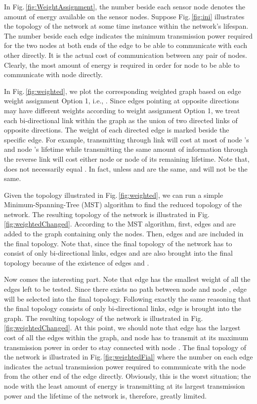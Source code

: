 \documentclass[journal,12pt,onecolumn]{IEEEtran}
\begin{document}
In Fig.\,\ref{fig:WeightAssignment}, the number beside each sensor
node denotes the amount of energy available on the sensor nodes.
Suppose Fig.\,\ref{fig:ini} illustrates the topology of the network
at some time instance within the network's lifespan. The number beside each edge indicates the
minimum transmission power required for the two nodes at both ends
of the edge to be able to communicate with each other directly. It is the actual cost of communication
between any pair of nodes. Clearly, the most amount of energy is required in order for node 
to be able to communicate with node  directly.







In Fig.\,\ref{fig:weighted}, we plot the corresponding weighted
graph based on edge weight assignment Option 1, i.e., . Since edges pointing at
opposite directions may have different weights according to weight
assignment Option 1, we treat each bi-directional link
within the graph as the union of two directed links of opposite
directions. The weight of each directed edge is marked beside the
specific edge. For example, transmitting through link 
will cost at most  of node 's and node 's lifetime while
transmitting the same amount of information through the reverse link
 will cost either node  or node   of its
remaining lifetime. Note that,  does not necessarily equal
. In fact, unless  and  are the same,  and  will not
be the same.


Given the topology illustrated in Fig.\,\ref{fig:weighted}, we can
run a simple Minimum-Spanning-Tree (MST) algorithm to find the
reduced topology of the network. The resulting topology of the
network is illustrated in Fig.\,\,\ref{fig:weightedChanged}.
According to the MST algorithm, first, edges  and  are
added to the graph containing only the nodes. Then, edges  and
 are included in the final topology. Note that, since the final
topology of the network has to consist of only bi-directional links,
edges  and  are also brought into the final topology
because of the existence of edges  and .

Now comes the interesting part. Note that edge  has the
smallest weight of all the edges left to be tested. Since there
exists no path between node  and node , edge  will be
selected into the final topology. Following exactly the same reasoning
that the final topology consists of only bi-directional links, edge
 is brought into the graph. The resulting topology of the
network is illustrated in Fig.\,\ref{fig:weightedChanged}. At this
point, we should note that edge  has the largest cost of all
the edges within the graph, and node  has to transmit at its
maximum transmission power in order to stay connected with node .
The final topology of the network is illustrated in
Fig.\,\ref{fig:weightedFial} where the number on each edge indicates
the actual transmission power required to communicate with the node
from the other end of the edge directly. Obviously, this is the
worst situation; the node with the least amount of energy is
transmitting at its largest transmission power and the lifetime of
the network is, therefore, greatly limited.
\end{document}
